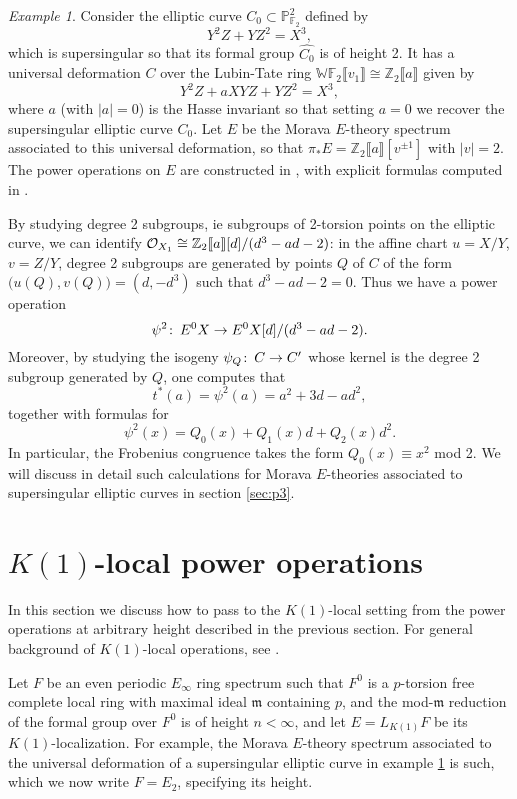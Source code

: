 \documentclass{gtpart}
\theoremstyle{definition}
\theoremstyle{remark}
\newtheorem{exam}[thm]{Example}
\def\co{\colon\thinspace}
\newcommand{\mb}[1]{\mathbb{#1}}
\newcommand{\mf}[1]{\mathfrak{#1}}
\newcommand{\CO}{{\cal O}}
\begin{document}
\begin{exam}
\label{ex:h2p2}
Consider the elliptic curve $C_0 \subset {\mb P}_{{\mb F}_2}^2$ 
defined by
\[
 Y^2 Z + Y Z^2 = X^3,
\]
which is supersingular so that 
its formal group $\widehat{C_0}$ is of height 2.  It has a universal 
deformation $C$ over the Lubin-Tate ring ${\mb W}{\mb F}_2 
\llbracket v_1 \rrbracket \cong {\mb Z}_2 \llbracket a \rrbracket$ 
given by 
\[
 Y^2 Z + a X Y Z + Y Z^2 = X^3,
\]
where $a$ (with $|a|=0$) is the Hasse invariant so that setting 
$a=0$ we recover the supersingular elliptic curve $C_0$.  Let $E$ 
be the Morava $E$-theory spectrum associated to this universal 
deformation, so that $\pi_* E = {\mb Z}_2 \llbracket a \rrbracket 
[v^{\pm 1}]$ with $|v| = 2$.  The power operations on $E$ are 
constructed in \cite{Andu}, with explicit formulas computed 
in \cite{h2p2,slides}.  

By studying degree 2 subgroups, ie subgroups of 2-torsion 
points on the elliptic curve, we can identify $\CO_{X_1} \cong 
{\mb Z}_2 \llbracket a \rrbracket [d] / (d^3 - a d - 2)$: in the 
affine chart $u = X/Y$, $v = Z/Y$, degree 2 subgroups are 
generated by points $Q$ of $C$ of the form $\big(u(Q), v(Q)\big) = 
(d, -d^3)$ such that $d^3 - a d - 2 = 0$.  Thus we have a power 
operation 
\[
 \psi^2\co E^0 X \to E^0 X [d] / (d^3 - a d - 2).
\]
Moreover, by studying the isogeny $\psi_Q\co C \to C'$ whose 
kernel is the degree 2 subgroup generated by $Q$, one computes that 
\[
 t^* (a) = \psi^2 (a) = a^2 + 3 d - a d^2,
\]
together with formulas for 
\[
 \psi^2 (x) = Q_0(x) + Q_1(x) d + Q_2(x) d^2.
\]
In particular, the Frobenius congruence takes the form 
$Q_0(x) \equiv x^2$ mod 2.  We will discuss in detail such calculations for Morava $E$-theories 
associated to supersingular elliptic curves in section \ref{sec:p3}.  
\end{exam}


\section{$K(1)$-local power operations}
\label{sec:K(1)}


In this section we discuss how to pass to the $K(1)$-local setting from 
the power operations at arbitrary height described in the previous 
section.  For general background of $K(1)$-local operations, see 
\cite{k1}.

Let $F$ be an even periodic $E_\infty$ ring spectrum such that $F^0$ is a 
$p$-torsion free complete local ring with maximal ideal $\mf m$ 
containing $p$, and the mod-$\mf m$ reduction of the formal group over 
$F^0$ is of height $n < \infty$, and let $E = L_{K(1)} F$ 
be its $K(1)$-localization.  For example, the Morava $E$-theory spectrum 
associated to the universal deformation of a supersingular elliptic 
curve in example \ref{ex:h2p2} is such, which we now write $F = E_2$, 
specifying its height.  
\end{document}
